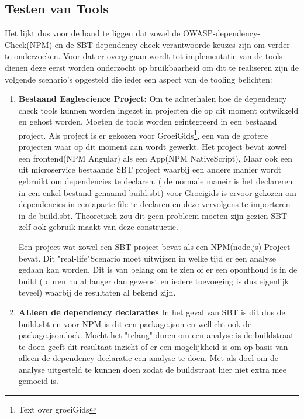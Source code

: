 %

\subsection{Testen van Tools}
Het lijkt dus voor de hand te liggen dat zowel de OWASP-dependency-Check(NPM) en de SBT-dependency-check verantwoorde keuzes zijn om verder te onderzoeken. Voor dat er overgegaan wordt tot implementatie van de tools dienen deze eerst worden onderzocht op bruikbaarheid om dit te realiseren zijn de volgende scenario's opgesteld die ieder een aspect van de tooling belichten:

\begin{enumerate}
    \item \textbf{Bestaand Eaglescience Project: }Om te achterhalen hoe de dependency check tools kunnen worden ingezet in projecten die op dit moment ontwikkeld en gehost worden. Moeten de tools worden geintegreerd in een bestaand project. Als project is er gekozen voor GroeiGids\footnote{Text over groeiGids}, een van de grotere projecten waar op dit moment aan wordt gewerkt. Het project bevat zowel een frontend(NPM Angular) als een App(NPM NativeScript), Maar ook een uit microservice bestaande SBT project waarbij een andere manier wordt gebruikt om dependencies te declaren. ( de normale maneir is het declareren in een enkel bestand genaamd build.sbt) voor Groeigids is ervoor gekozen om dependencies in een aparte file te declaren en deze vervolgens te importeren in de build.sbt. Theoretisch zou dit geen probleem moeten zijn gezien SBT zelf ook gebruik maakt van deze constructie.


    Een project wat zowel een SBT-project bevat als een NPM(node.js) Project bevat. Dit "real-life"Scenario moet uitwijzen in welke tijd er een analyse gedaan kan worden. Dit is van belang om te zien of er een oponthoud is in de build ( duren nu al langer dan gewenst en iedere toevoeging is dus eigenlijk teveel) waarbij de resultaten al bekend zijn.
    \item \textbf{ALleen de dependency declaraties} In het geval van SBT is dit dus de build.sbt en voor NPM is dit  een package.json en wellicht ook de package.json.lock. Mocht het "telang" duren om een analyse is de buildstraat te doen geeft dit resultaat inzicht of er een mogelijkheid is om op basis van alleen de dependency declaratie een analyse te doen. Met als doel om de analyse uitgesteld te kunnen doen zodat de buildstraat hier niet extra mee gemoeid is.
\end{enumerate}


